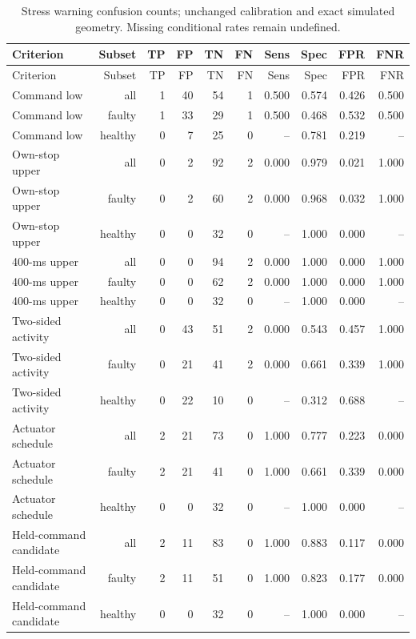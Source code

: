 \documentclass[10pt,letterpaper]{article}
\begin{document}
{\small
\begin{longtable}{lrrrrrrrrr}
\caption{Stress warning confusion counts; unchanged calibration and exact simulated geometry. Missing conditional rates remain undefined.}\\
\toprule
Criterion & Subset & TP & FP & TN & FN & Sens & Spec & FPR & FNR\\
\midrule\endfirsthead
\toprule
Criterion & Subset & TP & FP & TN & FN & Sens & Spec & FPR & FNR\\
\midrule\endhead
Command low & all & 1 & 40 & 54 & 1 & 0.500 & 0.574 & 0.426 & 0.500\\
Command low & faulty & 1 & 33 & 29 & 1 & 0.500 & 0.468 & 0.532 & 0.500\\
Command low & healthy & 0 & 7 & 25 & 0 & -- & 0.781 & 0.219 & --\\
Own-stop upper & all & 0 & 2 & 92 & 2 & 0.000 & 0.979 & 0.021 & 1.000\\
Own-stop upper & faulty & 0 & 2 & 60 & 2 & 0.000 & 0.968 & 0.032 & 1.000\\
Own-stop upper & healthy & 0 & 0 & 32 & 0 & -- & 1.000 & 0.000 & --\\
400-ms upper & all & 0 & 0 & 94 & 2 & 0.000 & 1.000 & 0.000 & 1.000\\
400-ms upper & faulty & 0 & 0 & 62 & 2 & 0.000 & 1.000 & 0.000 & 1.000\\
400-ms upper & healthy & 0 & 0 & 32 & 0 & -- & 1.000 & 0.000 & --\\
Two-sided activity & all & 0 & 43 & 51 & 2 & 0.000 & 0.543 & 0.457 & 1.000\\
Two-sided activity & faulty & 0 & 21 & 41 & 2 & 0.000 & 0.661 & 0.339 & 1.000\\
Two-sided activity & healthy & 0 & 22 & 10 & 0 & -- & 0.312 & 0.688 & --\\
Actuator schedule & all & 2 & 21 & 73 & 0 & 1.000 & 0.777 & 0.223 & 0.000\\
Actuator schedule & faulty & 2 & 21 & 41 & 0 & 1.000 & 0.661 & 0.339 & 0.000\\
Actuator schedule & healthy & 0 & 0 & 32 & 0 & -- & 1.000 & 0.000 & --\\
Held-command candidate & all & 2 & 11 & 83 & 0 & 1.000 & 0.883 & 0.117 & 0.000\\
Held-command candidate & faulty & 2 & 11 & 51 & 0 & 1.000 & 0.823 & 0.177 & 0.000\\
Held-command candidate & healthy & 0 & 0 & 32 & 0 & -- & 1.000 & 0.000 & --\\
\bottomrule
\end{longtable}
}
\end{document}
